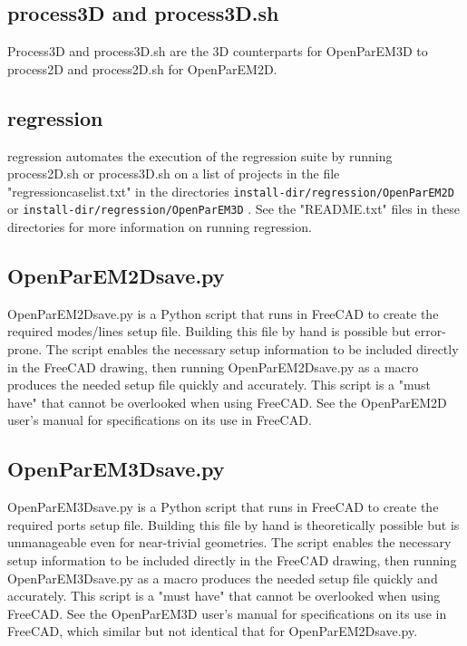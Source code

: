 \documentclass[titlepage]{article}
\renewcommand\_{\textunderscore\linebreak[1]}
\begin{document}
\subsection{process3D and process3D.sh}

Process3D and process3D.sh are the 3D counterparts for OpenParEM3D to process2D and process2D.sh for OpenParEM2D. 

\subsection{regression}

regression automates the execution of the regression suite by running process2D.sh or process3D.sh on a list of projects in the file "regression\_case\_list.txt" in the directories \verb+install-dir/regression/OpenParEM2D+ or \verb+install-dir/regression/OpenParEM3D+ .  See the "README.txt" files in these directories for more information on running regression.

\subsection{OpenParEM2D\_save.py}

OpenParEM2D\_save.py is a Python script that runs in FreeCAD to create the required modes/lines setup file. Building this file by hand is possible but error-prone.  The script enables the necessary setup information to be included directly in the FreeCAD drawing, then running OpenParEM2D\_save.py as a macro produces the needed setup file quickly and accurately.  This script is a "must have" that cannot be overlooked when using FreeCAD.  See the OpenParEM2D user's manual for specifications on its use in FreeCAD.

\subsection{OpenParEM3D\_save.py}

OpenParEM3D\_save.py is a Python script that runs in FreeCAD to create the required ports setup file. Building this file by hand is theoretically possible but is unmanageable even for near-trivial geometries.  The script enables the necessary setup information to be included directly in the FreeCAD drawing, then running OpenParEM3D\_save.py as a macro produces the needed setup file quickly and accurately.  This script is a "must have" that cannot be overlooked when using FreeCAD.  See the OpenParEM3D user's manual for specifications on its use in FreeCAD, which similar but not identical that for OpenParEM2D\_save.py.
\end{document}
